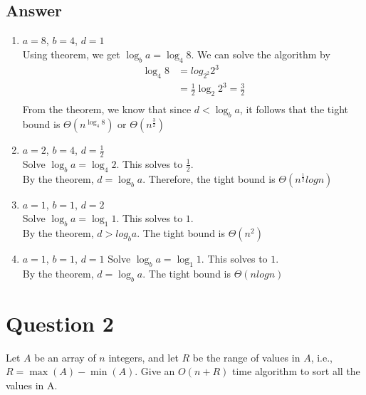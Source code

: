 \documentclass[
	12pt
]{fphw}
\begin{document}
\subsection*{Answer}
\begin{enumerate} %
	\item $a = 8$, $b = 4$, $d = 1$\\
	Using theorem, we get $\log_b a = \log_4 8$. We can solve the
	algorithm by
	\begin{align*}
		\log_4 8 &= log_{2^2} 2^3 \\
		&= \frac{1}{2} \log_2 2^3 = \frac{3}{2}\\
	\end{align*}
	From the theorem, we know that since $d < \log_b a$, it follows that the tight bound is $\Theta(n^{\log_4 8})$ or $\boxed{\Theta(n^{\frac{3}{2}})}$
	\item $a = 2$, $b = 4$, $d = \frac{1}{2}$ \\
	Solve $\log_b a = \log_4 2$. This solves to $\frac{1}{2}$.\\
	By the theorem, $d = \log_b a$. Therefore, the tight bound is $\boxed{\Theta(n^{\frac{1}{2}}logn)}$
	\item $a = 1$, $b = 1$, $d = 2$ \\
	Solve $\log_b a = \log_1 1$. This solves to $1$.\\
	By the theorem, $d > log_b a$. The tight bound is $\boxed{\Theta(n^2)}$
	\item $a = 1$, $b = 1$, $d = 1$
	Solve $\log_b a = \log_1 1$. This solves to $1$.\\
	By the theorem, $d = \log_b a$. The tight bound is $\boxed{\Theta(nlogn)}$
\end{enumerate}

\pagebreak
\section*{Question 2}

\begin{problem}
	Let $A$ be an array of $n$ integers, and let $R$ be the range of values in $A$, i.e., $R = \max(A) - \min(A)$. Give an $O(n + R)$ time algorithm to sort all the values in A.
\end{problem}

\end{document}
